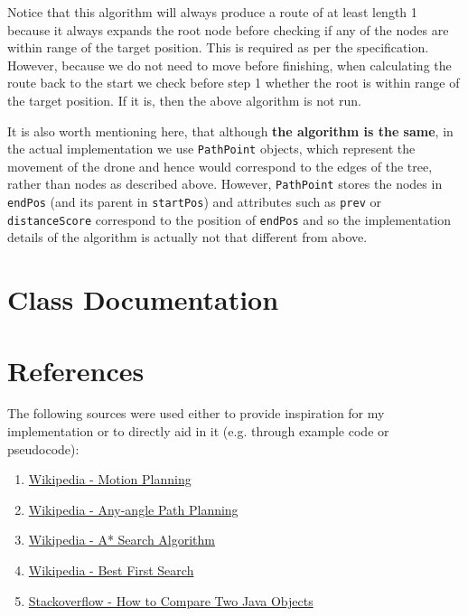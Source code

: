 \documentclass[11pt]{article}
\begin{document}
Notice that this algorithm will always produce a route of at least length 1 because it always expands the root node before checking if any of the nodes are within range of the target position. This is required as per the specification. However, because we do not need to move before finishing, when calculating the route back to the start we check before step 1 whether the root is within range of the target position. If it is, then the above algorithm is not run.

It is also worth mentioning here, that although \textbf{the algorithm is the same}, in the actual implementation we use \texttt{PathPoint} objects, which represent the movement of the drone and hence would correspond to the edges of the tree, rather than nodes as described above. However, \texttt{PathPoint} stores the nodes in \texttt{endPos} (and its parent in \texttt{startPos}) and attributes such as \texttt{prev} or \texttt{distanceScore} correspond to the position of \texttt{endPos} and so the implementation details of the algorithm is actually not that different from above.

\newpage

\section{Class Documentation}


\newpage

\section{References}
The following sources were used either to provide inspiration for my implementation or to directly aid in it (e.g. through example code or pseudocode):
\begin{enumerate}
    \item \href{https://en.wikipedia.org/wiki/Motion_planning#Grid-based_search}{Wikipedia - Motion Planning}
    \item \href{https://en.wikipedia.org/wiki/Any-angle_path_planning}{Wikipedia - Any-angle Path Planning}
    \item \href{https://en.wikipedia.org/wiki/A*_search_algorithm#}{Wikipedia - A* Search Algorithm}
    \item \href{https://en.wikipedia.org/wiki/Best-first_search}{Wikipedia - Best First Search}
    \item \href{https://stackoverflow.com/questions/16069106/how-to-compare-two-java-objects}{Stackoverflow - How to Compare Two Java Objects}
\end{enumerate}
\end{document}
